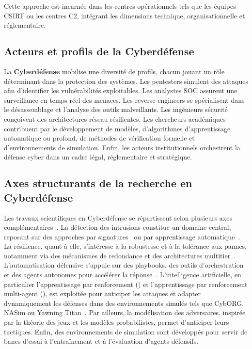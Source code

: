 Cette approche est incarnée dans les centres opérationnels tels que les équipes \ac{CSIRT} ou les centres \ac{C2}, intégrant les dimensions technique, organisationnelle et réglementaire.

\subsection*{Acteurs et profils de la Cyberdéfense}

La \textbf{Cyberdéfense} mobilise une diversité de profils, chacun jouant un rôle déterminant dans la protection des systèmes. Les pentesters simulent des attaques afin d'identifier les vulnérabilités exploitables. Les analystes \ac{SOC} assurent une surveillance en temps réel des menaces. Les reverse engineers se spécialisent dans le désassemblage et l'analyse des outils malveillants. Les ingénieurs sécurité conçoivent des architectures réseau résilientes. Les chercheurs académiques contribuent par le développement de modèles, d'algorithmes d'apprentissage automatique ou profond, de méthodes de vérification formelle et d'environnements de simulation. Enfin, les acteurs institutionnels orchestrent la défense cyber dans un cadre légal, réglementaire et stratégique.


\subsection*{Axes structurants de la recherche en Cyberdéfense}

Les travaux scientifiques en Cyberdéfense se répartissent selon plusieurs axes complémentaires~\cite{Buczak2016}. La détection des intrusions constitue un domaine central, reposant sur des approches par signatures~\cite{Axelsson2000} ou par apprentissage automatique~\cite{Sommer2010,Buczak2016}. La résilience, quant à elle, s'intéresse à la robustesse et à la tolérance aux pannes, notamment via des mécanismes de redondance et des architectures multitier~\cite{Bodeau2011}. L'automatisation défensive s'appuie sur des playbooks, des outils d'orchestration et des agents autonomes pour accélérer la réponse~\cite{Hazra2022}. L'intelligence artificielle, en particulier l'apprentissage par renforcement () et l'apprentissage par renforcement multi-agent (), est exploitée pour anticiper les attaques et adapter dynamiquement les défenses dans des environnements simulés tels que CybORG, NASim ou Yawning Titan~\cite{Standen2021, nasim2023,Andrew2022}. Par ailleurs, la modélisation des adversaires, inspirée par la théorie des jeux et les modèles probabilistes, permet d'anticiper leurs tactiques. Enfin, des environnements de simulation sont développés pour servir de bancs d'essai à l'entraînement et à l'évaluation d'agents défensifs.


